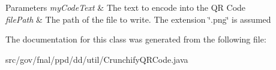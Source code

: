 \begin{DoxyParams}{Parameters}
{\em my\-Code\-Text} & The text to encode into the Q\-R Code \\
\hline
{\em file\-Path} & The path of the file to write. The extension \char`\"{}.\-png\char`\"{} is assumed \\
\hline
\end{DoxyParams}


The documentation for this class was generated from the following file\-:\begin{DoxyCompactItemize}
\item 
src/gov/fnal/ppd/dd/util/Crunchify\-Q\-R\-Code.\-java\end{DoxyCompactItemize}
